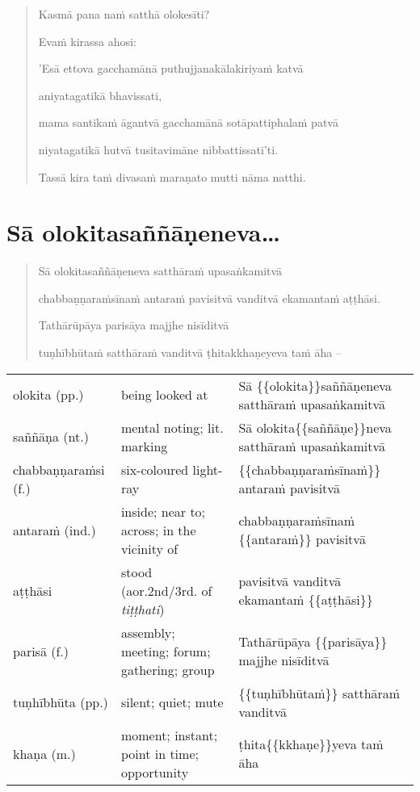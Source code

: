\documentclass[11pt,oneside]{memoir}
\begin{document}

\clearpage

\begin{quote}
Kasmā pana naṁ satthā olokesīti?

Evaṁ kirassa ahosi:

'Esā ettova gacchamānā puthujjanakālakiriyaṁ katvā

aniyatagatikā bhavissati,

mama santikaṁ āgantvā gacchamānā sotāpattiphalaṁ patvā

niyatagatikā hutvā tusitavimāne nibbattissatī'ti.

Tassā kira taṁ divasaṁ maraṇato mutti nāma natthi.
\end{quote}


\clearpage

\section{Sā olokitasaññāṇeneva\ldots{}}
\label{sec:org37b92b0}

\begin{quote}
Sā olokitasaññāṇeneva satthāraṁ upasaṅkamitvā

chabbaṇṇaraṁsīnaṁ antaraṁ pavisitvā vanditvā ekamantaṁ aṭṭhāsi.

Tathārūpāya parisāya majjhe nisīditvā

tuṇhībhūtaṁ satthāraṁ vanditvā ṭhitakkhaṇeyeva taṁ āha –
\end{quote}

\begin{longtable}{L{\colOne} L{\colTwo} H}
olokita (pp.) & being looked at & Sā \{\{olokita\}\}saññāṇeneva satthāraṁ upasaṅkamitvā\\[0pt]
saññāṇa (nt.) & mental noting; lit. marking & Sā olokita\{\{saññāṇe\}\}neva satthāraṁ upasaṅkamitvā\\[0pt]
chabbaṇṇaraṁsi (f.) & six-coloured light-ray & \{\{chabbaṇṇaraṁsīnaṁ\}\} antaraṁ pavisitvā\\[0pt]
antaraṁ (ind.) & inside; near to; across; in the vicinity of & chabbaṇṇaraṁsīnaṁ \{\{antaraṁ\}\} pavisitvā\\[0pt]
aṭṭhāsi & stood (aor.2nd/3rd. of \emph{tiṭṭhati}) & pavisitvā vanditvā ekamantaṁ \{\{aṭṭhāsi\}\}\\[0pt]
parisā (f.) & assembly; meeting; forum; gathering; group & Tathārūpāya \{\{parisāya\}\} majjhe nisīditvā\\[0pt]
tuṇhībhūta (pp.) & silent; quiet; mute & \{\{tuṇhībhūtaṁ\}\} satthāraṁ vanditvā\\[0pt]
khaṇa (m.) & moment; instant; point in time; opportunity & ṭhita\{\{kkhaṇe\}\}yeva taṁ āha\\[0pt]
\end{longtable}
\end{document}
